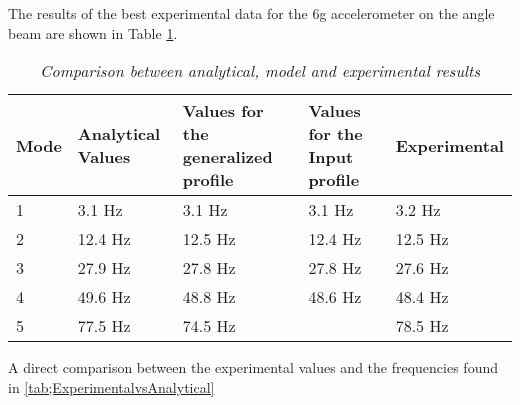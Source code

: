 %
%

\indent The results of the best experimental data for the 6g
 accelerometer on the angle beam are shown in Table
  \ref{tab:Results_Comp}.\\
\begin{table}
\begin{center}
    \begin{tabular}{|l| p{3.5cm}| p{3cm}| p{3cm}| p{3cm}|}
    \hline
    \textbf{Mode} & \textbf{Analytical Values} & \textbf{Values for the generalized profile} & \textbf{Values for the Input profile} & \textbf{Experimental} \\\hline
    1    & 3.1 Hz            & 3.1 Hz                             & 3.1 Hz                       & 3.2 Hz       \\\hline
    2    & 12.4 Hz           & 12.5 Hz                            & 12.4 Hz                      & 12.5 Hz      \\\hline
    3    & 27.9 Hz           & 27.8 Hz                            & 27.8 Hz                      & 27.6 Hz      \\\hline
    4    & 49.6 Hz           & 48.8 Hz                            & 48.6 Hz                      & 48.4 Hz      \\\hline
    5    & 77.5 Hz           & 74.5 Hz                            &                             & 78.5 Hz      \\\hline
    \end{tabular}
    \caption{\textit{Comparison between analytical, model and experimental results}}
    \label{tab:Results_Comp}
\end{center}
\end{table}

A direct comparison between the experimental values and the frequencies found in \ref{tab;ExperimentalvsAnalytical}\\


